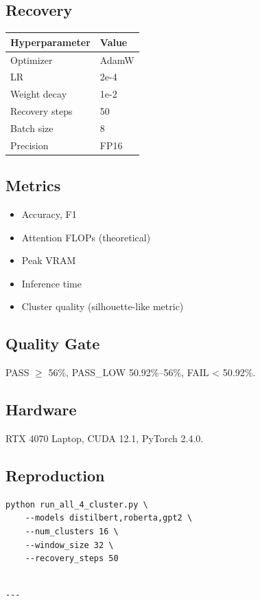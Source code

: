 \subsection{Recovery}

\begin{table}[H]
\centering
\small
\begin{tabular}{ll}
\toprule
\textbf{Hyperparameter} & \textbf{Value} \\
\midrule
Optimizer & AdamW \\
LR & 2e-4 \\
Weight decay & 1e-2 \\
Recovery steps & 50 \\
Batch size & 8 \\
Precision & FP16 \\
\bottomrule
\end{tabular}
\end{table}

\subsection{Metrics}

\begin{itemize}
\item Accuracy, F1
\item Attention FLOPs (theoretical)
\item Peak VRAM
\item Inference time
\item Cluster quality (silhouette-like metric)

\end{itemize}
\subsection{Quality Gate}

PASS $\ge$ 56\%, PASS\_LOW 50.92\%--56\%, FAIL < 50.92\%.

\subsection{Hardware}

RTX 4070 Laptop, CUDA 12.1, PyTorch 2.4.0.

\subsection{Reproduction}

\begin{lstlisting}
python run_all_4_cluster.py \
    --models distilbert,roberta,gpt2 \
    --num_clusters 16 \
    --window_size 32 \
    --recovery_steps 50
\end{lstlisting}
\begin{lstlisting}

---
\end{lstlisting}

